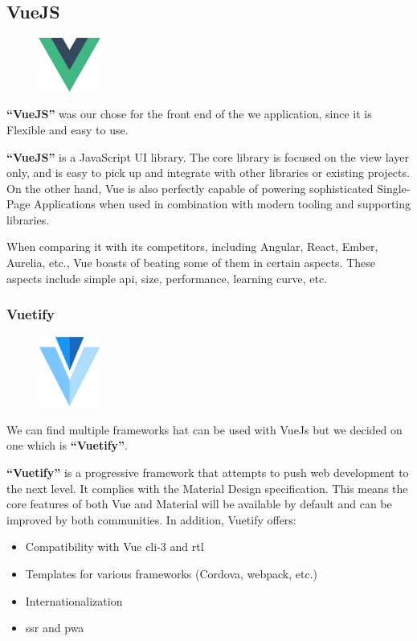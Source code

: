 \documentclass[12pt,a4paper]{report}
\begin{document}
	\subsection{VueJS}
	\begin{figure}
		\centering
		\includegraphics[width=0.8in]{vue-logo.png}	
	\end{figure}
	\textbf{``VueJS''} was our chose for the front end of the we application, since it is Flexible and easy to use. \cite{vuejsbook}\par 
	\textbf{``VueJS''} is a JavaScript UI library. The core library is focused on the view layer only, and is easy to pick up and integrate with other libraries or existing projects. On the other hand, Vue is also perfectly capable of powering sophisticated Single-Page Applications when used in combination with modern tooling and supporting libraries. 
	\par 
	When comparing it with its competitors, including Angular, React, Ember, Aurelia, etc., Vue boasts of beating some of them in certain aspects. These aspects include simple \ac{api}, size, performance, learning curve, etc.
	\clearpage
	\subsubsection*{Vuetify}
	\begin{figure}
		\centering
		\includegraphics[width=0.8in]{vuetify-logo.png}	
		
	\end{figure}
	We can find multiple frameworks hat can be used with VueJs but we decided on one which is   \textbf{``Vuetify''}.\par 
	\textbf{``Vuetify''} is a progressive framework that attempts to push web development to the next level. It complies with the Material Design specification. This means the core features of both Vue and Material will be available by default and can be improved by both communities. In addition, Vuetify offers:
	\begin{itemize}
		\item Compatibility with Vue \ac{cli}-3 and \ac{rtl} 
		\item Templates for various frameworks (Cordova, webpack, etc.)
		\item Internationalization
		\item  \ac{ssr} and  \ac{pwa} 
		
	\end{itemize}
\end{document}
